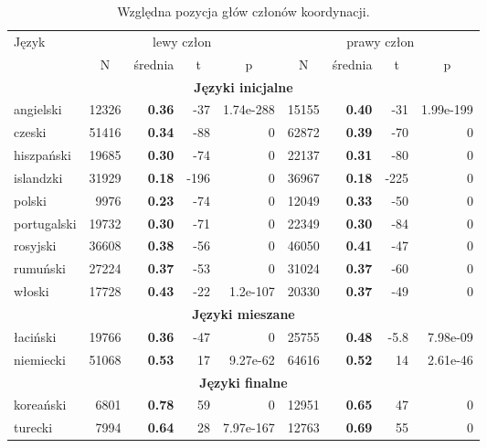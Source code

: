 \begin{table}[H]
\centering
\begin{tabular}{lrrrrrrrr}
  \toprule
Język & \multicolumn{4}{c}{lewy człon} & \multicolumn{4}{c}{prawy człon}\\
 & \multicolumn{1}{c}{N} & \multicolumn{1}{c}{średnia} & \multicolumn{1}{c}{t} & \multicolumn{1}{c}{p} & \multicolumn{1}{c}{N} & \multicolumn{1}{c}{średnia} & \multicolumn{1}{c}{t} & \multicolumn{1}{c}{p} \\ 
  \midrule
  \multicolumn{9}{c}{\textbf{Języki inicjalne}} \\
  \midrule
  angielski 	& 12326 	& \textbf{0.36} & -37 & 1.74e-288 & 15155 & \textbf{0.40} & -31 & 1.99e-199 \\
  czeski 	& 51416 	& \textbf{0.34} & -88 & 0 		& 62872 & \textbf{0.39} & -70 & 0 \\ 
  hiszpański	& 19685 & \textbf{0.30} & -74 & 0 		& 22137 & \textbf{0.31} & -80 & 0 \\ 
  islandzki 	& 31929 	& \textbf{0.18} & -196 & 0 		& 36967 & \textbf{0.18} & -225 & 0 \\ 
  polski 	& 9976 	& \textbf{0.23} & -74 & 0 		& 12049 & \textbf{0.33} & -50 & 0 \\ 
  portugalski & 19732 & \textbf{0.30} & -71 & 0 		& 22349 & \textbf{0.30} & -84 & 0 \\ 
  rosyjski 	& 36608 	& \textbf{0.38} & -56 & 0 		& 46050 & \textbf{0.41} & -47 & 0 \\ 
  rumuński 	& 27224 	& \textbf{0.37} & -53 & 0 		& 31024 & \textbf{0.37} & -60 & 0 \\ 
  włoski 	& 17728 	& \textbf{0.43} & -22 & 1.2e-107	& 20330 & \textbf{0.37} & -49 & 0 \\
  \midrule
  \multicolumn{9}{c}{\textbf{Języki mieszane}} \\
  \midrule
  łaciński 	& 19766 & \textbf{0.36}	& -47 & 0 		& 25755 & \textbf{0.48} & -5.8 & 7.98e-09 \\
  niemiecki & 51068 	& \textbf{0.53}	& 17 & 9.27e-62	& 64616 & \textbf{0.52} & 14 & 2.61e-46 \\ 
  \midrule
  \multicolumn{9}{c}{\textbf{Języki finalne}} \\
  \midrule
  koreański	& 6801 & \textbf{0.78} & 59 & 0 			& 12951 & \textbf{0.65} & 47 & 0 \\ 
  turecki 	& 7994 & \textbf{0.64} & 28 & 7.97e-167	& 12763 & \textbf{0.69} & 55 & 0 \\
  \bottomrule
\end{tabular}
\caption{Względna pozycja głów członów koordynacji.}
\label{tab:pozycja-głowy}
\end{table}

